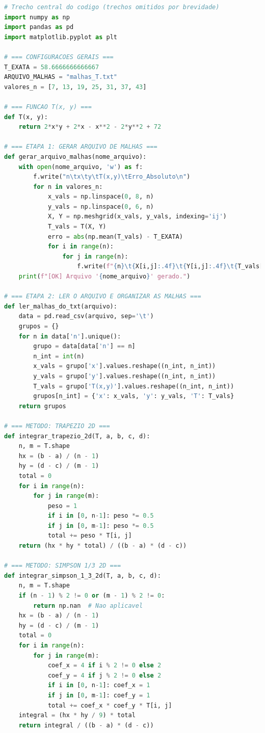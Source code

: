 \documentclass[12pt]{article}
\begin{document}
\begin{lstlisting}[language=Python, caption={Funcao principal que executa os calculos e organiza os resultados.}]
# Trecho central do codigo (trechos omitidos por brevidade)
import numpy as np
import pandas as pd
import matplotlib.pyplot as plt

# === CONFIGURACOES GERAIS ===
T_EXATA = 58.6666666666667
ARQUIVO_MALHAS = "malhas_T.txt"
valores_n = [7, 13, 19, 25, 31, 37, 43]

# === FUNCAO T(x, y) ===
def T(x, y):
    return 2*x*y + 2*x - x**2 - 2*y**2 + 72

# === ETAPA 1: GERAR ARQUIVO DE MALHAS ===
def gerar_arquivo_malhas(nome_arquivo):
    with open(nome_arquivo, 'w') as f:
        f.write("n\tx\ty\tT(x,y)\tErro_Absoluto\n")
        for n in valores_n:
            x_vals = np.linspace(0, 8, n)
            y_vals = np.linspace(0, 6, n)
            X, Y = np.meshgrid(x_vals, y_vals, indexing='ij')
            T_vals = T(X, Y)
            erro = abs(np.mean(T_vals) - T_EXATA)
            for i in range(n):
                for j in range(n):
                    f.write(f"{n}\t{X[i,j]:.4f}\t{Y[i,j]:.4f}\t{T_vals[i,j]:.4f}\t{erro:.6f}\n")
    print(f"[OK] Arquivo '{nome_arquivo}' gerado.")

# === ETAPA 2: LER O ARQUIVO E ORGANIZAR AS MALHAS ===
def ler_malhas_do_txt(arquivo):
    data = pd.read_csv(arquivo, sep='\t')
    grupos = {}
    for n in data['n'].unique():
        grupo = data[data['n'] == n]
        n_int = int(n)
        x_vals = grupo['x'].values.reshape((n_int, n_int))
        y_vals = grupo['y'].values.reshape((n_int, n_int))
        T_vals = grupo['T(x,y)'].values.reshape((n_int, n_int))
        grupos[n_int] = {'x': x_vals, 'y': y_vals, 'T': T_vals}
    return grupos

# === METODO: TRAPEZIO 2D ===
def integrar_trapezio_2d(T, a, b, c, d):
    n, m = T.shape
    hx = (b - a) / (n - 1)
    hy = (d - c) / (m - 1)
    total = 0
    for i in range(n):
        for j in range(m):
            peso = 1
            if i in [0, n-1]: peso *= 0.5
            if j in [0, m-1]: peso *= 0.5
            total += peso * T[i, j]
    return (hx * hy * total) / ((b - a) * (d - c))

# === METODO: SIMPSON 1/3 2D ===
def integrar_simpson_1_3_2d(T, a, b, c, d):
    n, m = T.shape
    if (n - 1) % 2 != 0 or (m - 1) % 2 != 0:
        return np.nan  # Nao aplicavel
    hx = (b - a) / (n - 1)
    hy = (d - c) / (m - 1)
    total = 0
    for i in range(n):
        for j in range(m):
            coef_x = 4 if i % 2 != 0 else 2
            coef_y = 4 if j % 2 != 0 else 2
            if i in [0, n-1]: coef_x = 1
            if j in [0, m-1]: coef_y = 1
            total += coef_x * coef_y * T[i, j]
    integral = (hx * hy / 9) * total
    return integral / ((b - a) * (d - c))


\end{lstlisting}
\end{document}
